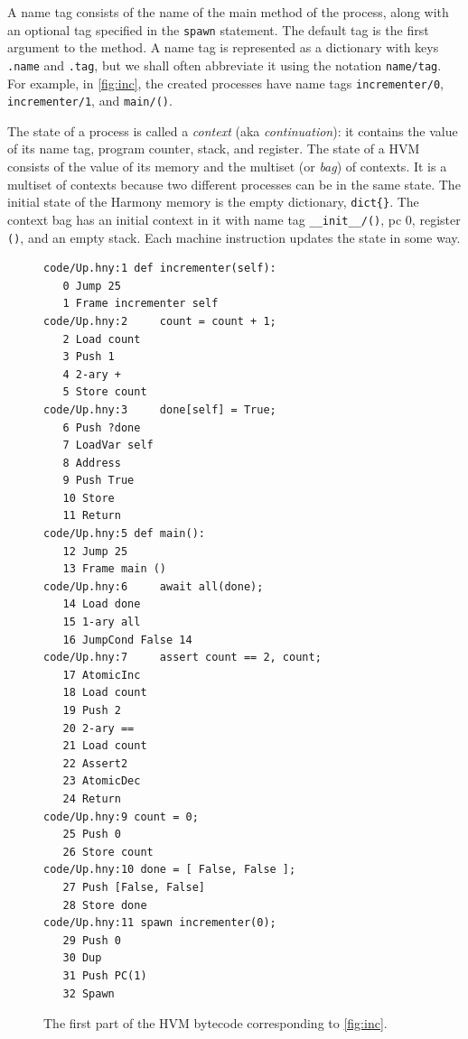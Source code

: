 \documentclass{report}
\newenvironment{code}{
\tcolorbox
}{
\endtcolorbox
}
\begin{document}
A name tag consists of the name of the main method of the process,
along with an optional tag specified in the \texttt{spawn}
%
%
statement.
The default tag is the first argument to the method.
A name tag is represented as a dictionary with keys \texttt{.name}
and \texttt{.tag}, but we shall often abbreviate it using the notation
\texttt{name/tag}.
For example, in \autoref{fig:inc}, the created processes have name tags
\texttt{incrementer/0}, \texttt{incrementer/1}, and \texttt{main/()}.

%

The state of a process is called a \emph{context} (aka \emph{continuation}):
%
%
it contains the value of
its name tag, program counter, stack, and register.
The state of a HVM
consists of the value of its memory and the multiset (or \emph{bag})
%
%
of contexts.  It is a multiset of contexts because two different processes can
be in the same state.
The initial state of the Harmony memory is the empty dictionary, \texttt{dict\{\}}.
The context bag has an initial context in it with name tag
\texttt{\_\_init\_\_/()}, pc 0, register \texttt{()}, and an empty stack.
Each machine instruction updates the state in some way.

\begin{figure}
\begin{code}
\begin{verbatim}
code/Up.hny:1 def incrementer(self):
   0 Jump 25
   1 Frame incrementer self
code/Up.hny:2     count = count + 1;
   2 Load count
   3 Push 1
   4 2-ary +
   5 Store count
code/Up.hny:3     done[self] = True;
   6 Push ?done
   7 LoadVar self
   8 Address
   9 Push True
   10 Store
   11 Return
code/Up.hny:5 def main():
   12 Jump 25
   13 Frame main ()
code/Up.hny:6     await all(done);
   14 Load done
   15 1-ary all
   16 JumpCond False 14
code/Up.hny:7     assert count == 2, count;
   17 AtomicInc
   18 Load count
   19 Push 2
   20 2-ary ==
   21 Load count
   22 Assert2
   23 AtomicDec
   24 Return
code/Up.hny:9 count = 0;
   25 Push 0
   26 Store count
code/Up.hny:10 done = [ False, False ];
   27 Push [False, False]
   28 Store done
code/Up.hny:11 spawn incrementer(0);
   29 Push 0
   30 Dup
   31 Push PC(1)
   32 Spawn
\end{verbatim}
\end{code}
\caption{The first part of the HVM bytecode corresponding to \autoref{fig:inc}.}
\label{fig:inccode}
\end{figure}
\end{document}
